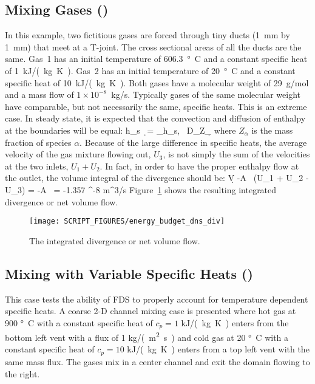 \documentclass[11pt]{book}
\begin{document}
\subsection{Mixing Gases (\texorpdfstring{}{energy\_budget\_dns})}
\label{energy_budget_dns_100}

In this example, two fictitious gases are forced through tiny ducts (1~mm by 1~mm) that meet at a T-joint. The cross sectional areas of all the ducts are the same. Gas~1 has an initial temperature of 606.3~\si{\degree C} and a constant specific heat of 1~\si{kJ/(kg.K)}. Gas~2 has an initial temperature of 20~\si{\degree C} and a constant specific heat of 10~\si{kJ/(kg.K)}. Both gases have a molecular weight of 29~g/mol and a mass flow of $1 \times 10^{-8}$~kg/s. Typically gases of the same molecular weight have comparable, but not necessarily the same, specific heats. This is an extreme case. In steady state, it is expected that the convection and diffusion of enthalpy at the boundaries will be equal:
\be \int h_{\rm s} \, \rho \bu \cdot \d\bS = \sum_\alpha \int h_{s,\alpha} \, \rho D_\alpha \nabla Z_\alpha \cdot \d\bS \ee
where $Z_\alpha$ is the mass fraction of species $\alpha$. Because of the large difference in specific heats, the average velocity of the gas mixture flowing out, $U_3$, is not simply the sum of the velocities at the two inlets, $U_1+U_2$. In fact, in order to have the proper enthalpy flow at the outlet, the volume integral of the divergence should be:
\be \int \nabla \cdot \bu \; \d V \equiv -A \, (U_1 + U_2 - U_3) = -A \,  = -1.357 ^{-8} \; \hbox{m}^3/\hbox{s} \label{div2} \ee
Figure~\ref{energy_budget_dns} shows the resulting integrated divergence or net volume flow.

\begin{figure}[ht]
\centering
\texttt{[image: SCRIPT\_FIGURES/energy\_budget\_dns\_div]}
\caption[The  test case]{The integrated divergence or net volume flow.}
\label{energy_budget_dns}
\end{figure}



\subsection{Mixing with Variable Specific Heats (\texorpdfstring{}{energy\_budget\_tmix})}
\label{energy_budget_tmix}

This case tests the ability of FDS to properly account for temperature dependent specific heats.  A coarse 2-D channel mixing case is presented where hot gas at 900 \si{\degree C} with a constant specific heat of $c_p=1$ \si{kJ/(kg.K)} enters from the bottom left vent with a flux of 1 \si{kg/(m^2.s)} and cold gas at 20 \si{\degree C} with a constant specific heat of $c_p=10$ \si{kJ/(kg.K)} enters from a top left vent with the same mass flux.  The gases mix in a center channel and exit the domain flowing to the right.
\end{document}

